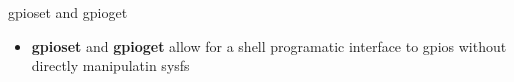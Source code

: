 \begin{frame}
   {gpioset and gpioget}
   \begin{itemize}
      \item \textbf{gpioset} and \textbf{gpioget} allow for a shell programatic 
	      interface to gpios without directly manipulatin sysfs
   \end{itemize}
\end{frame}

\cprotect\note{


}

